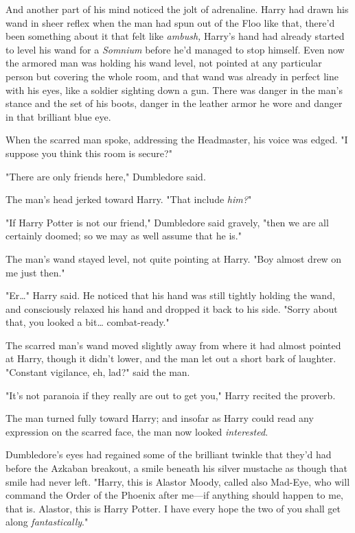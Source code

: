 And another part of his mind noticed the jolt of adrenaline. Harry had drawn
his wand in sheer reflex when the man had spun out of the Floo like that,
there'd been something about it that felt like \emph{ambush,} Harry's hand had
already started to level his wand for a \emph{Somnium} before he'd managed to
stop himself. Even now the armored man was holding his wand level, not pointed
at any particular person but covering the whole room, and that wand was already
in perfect line with his eyes, like a soldier sighting down a gun. There was
danger in the man's stance and the set of his boots, danger in the leather
armor he wore and danger in that brilliant blue eye.

When the scarred man spoke, addressing the Headmaster, his voice was edged. "I
suppose you think this room is secure?"

"There are only friends here," Dumbledore said.

The man's head jerked toward Harry. "That include \emph{him?}"

"If Harry Potter is not our friend," Dumbledore said gravely, "then we are all
certainly doomed; so we may as well assume that he is."

The man's wand stayed level, not quite pointing at Harry. "Boy almost drew on
me just then."

"Er{\ldots}" Harry said. He noticed that his hand was still tightly holding the
wand, and consciously relaxed his hand and dropped it back to his side. "Sorry
about that, you looked a bit{\ldots} combat-ready."

The scarred man's wand moved slightly away from where it had almost pointed at
Harry, though it didn't lower, and the man let out a short bark of laughter.
"Constant vigilance, eh, lad?" said the man.

"It's not paranoia if they really are out to get you," Harry recited the
proverb.

The man turned fully toward Harry; and insofar as Harry could read any
expression on the scarred face, the man now looked \emph{interested}.

Dumbledore's eyes had regained some of the brilliant twinkle that they'd had
before the Azkaban breakout, a smile beneath his silver mustache as though that
smile had never left. "Harry, this is Alastor Moody, called also Mad-Eye, who
will command the Order of the Phoenix after me---if anything should happen to
me, that is. Alastor, this is Harry Potter. I have every hope the two of you
shall get along \emph{fantastically}."

